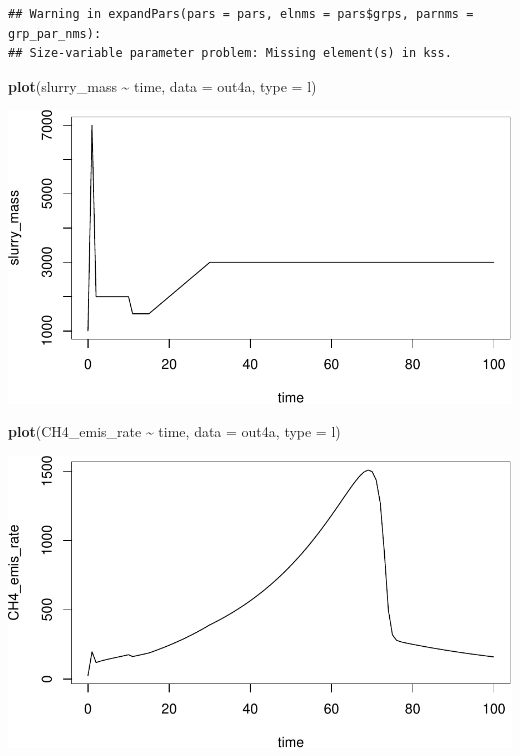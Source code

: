 \documentclass[
]{article}
\newenvironment{Shaded}{\begin{snugshade}}{\end{snugshade}}
\newcommand{\AttributeTok}[1]{\textcolor[rgb]{0.13,0.29,0.53}{#1}}
\newcommand{\FunctionTok}[1]{\textcolor[rgb]{0.13,0.29,0.53}{\textbf{#1}}}
\newcommand{\NormalTok}[1]{#1}
\newcommand{\SpecialCharTok}[1]{\textcolor[rgb]{0.81,0.36,0.00}{\textbf{#1}}}
\newcommand{\StringTok}[1]{\textcolor[rgb]{0.31,0.60,0.02}{#1}}
\begin{document}
\begin{verbatim}
## Warning in expandPars(pars = pars, elnms = pars$grps, parnms = grp_par_nms):
## Size-variable parameter problem: Missing element(s) in kss.
\end{verbatim}

\begin{Shaded}
\begin{Highlighting}[]
\FunctionTok{plot}\NormalTok{(slurry\_mass }\SpecialCharTok{\textasciitilde{}}\NormalTok{ time, }\AttributeTok{data =}\NormalTok{ out4a, }\AttributeTok{type =} \StringTok{\textquotesingle{}l\textquotesingle{}}\NormalTok{)}
\end{Highlighting}
\end{Shaded}

\includegraphics{simple_demo_files/figure-latex/unnamed-chunk-25-1.pdf}

\begin{Shaded}
\begin{Highlighting}[]
\FunctionTok{plot}\NormalTok{(CH4\_emis\_rate }\SpecialCharTok{\textasciitilde{}}\NormalTok{ time, }\AttributeTok{data =}\NormalTok{ out4a, }\AttributeTok{type =} \StringTok{\textquotesingle{}l\textquotesingle{}}\NormalTok{)}
\end{Highlighting}
\end{Shaded}

\includegraphics{simple_demo_files/figure-latex/unnamed-chunk-25-2.pdf}
\end{document}

